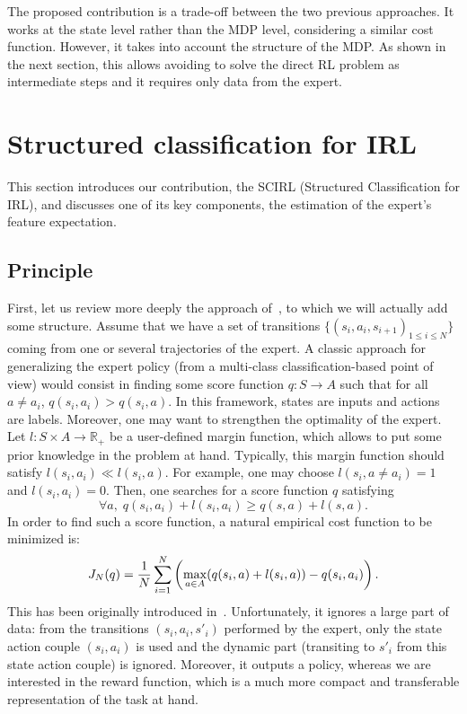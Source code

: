 \documentclass[tablecaption=bottom]{jmlr}
\begin{document}
The proposed contribution is a trade-off between the two previous
approaches. It works at the state level rather than the MDP level,
considering a similar cost function. However, it takes into account
the structure of the MDP. As shown in the next section, this allows
avoiding to solve the direct RL problem as intermediate steps and it
requires only data from the expert.

\section{Structured classification for IRL}
\label{sec:scirl}

This section introduces our contribution, the SCIRL (Structured
Classification for IRL), and discusses one of its key components,
the estimation of the expert's feature expectation.

\subsection{Principle}

First, let us review more deeply the approach
of~\cite{ratliff2007imitation}, to which we will actually add some
structure. Assume that we have a set of transitions
$\{(s_i,a_i,s_{i+1})_{1\leq i\leq N}\}$ coming from one or several
trajectories of the expert. A classic approach for generalizing the
expert policy (from a multi-class classification-based point of
view) would consist in finding some score function $q:S\rightarrow
A$ such that for all $a\neq a_i$, $q(s_i,a_i)>q(s_i,a)$. In this
framework, states are inputs and actions are labels. Moreover, one
may want to strengthen the optimality of the expert. Let $l:S\times
A\rightarrow\mathbb{R}_+$ be a user-defined margin function, which
allows to put some prior knowledge in the problem at hand.
Typically, this margin function should satisfy $l(s_i,a_i)\ll
l(s_i,a)$. For example, one may choose $l(s_i,a\neq a_i)=1$ and
$l(s_i,a_i)=0$. Then, one searches for a score function $q$
satisfying
\begin{equation}
\label{eq:inequalities_score}
  \forall a,\; q(s_i,a_i) + l(s_i,a_i) \geq q(s,a) + l(s,a).\nonumber
\end{equation}
In order to find such a score function, a natural empirical cost
function to be minimized is:
\begin{equation}
\label{Jdef.eqn} J_N(q) = {1\over N} \sum_{i=1}^N\left(\max_{a\in
A}(q(s_i,a) + l(s_i,a)) - q(s_i,a_i) \right).
\end{equation}
This has been originally introduced in~\cite{ratliff2007imitation}.
Unfortunately, it ignores a large part of data: from the transitions
$(s_i,a_i,s'_i)$ performed by the expert, only the state action
couple $(s_i,a_i)$ is used and the dynamic part (transiting to
$s'_i$ from this state action couple) is ignored.
%
Moreover, it outputs a policy, whereas we are interested in the
reward function, which is a much more compact and transferable
representation of the task at hand.
\end{document}
